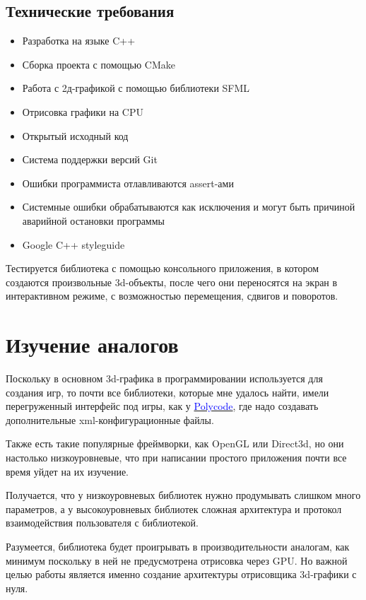 \documentclass{article}
\begin{document}
\subsection{Технические требования}
\begin{itemize}
\item Разработка на языке C++
\item Сборка проекта с помощью CMake
\item Работа с 2д-графикой с помощью библиотеки SFML
\item Отрисовка графики на CPU
\item Открытый исходный код
\item Система поддержки версий Git
\item Ошибки программиста отлавливаются assert-ами
\item Системные ошибки обрабатываются как исключения и могут быть причиной аварийной остановки программы
\item Google C++ styleguide
\end{itemize}

Тестируется библиотека с помощью консольного приложения, в котором создаются произвольные 3d-объекты, после чего они переносятся на экран в интерактивном режиме, с возможностью перемещения, сдвигов и поворотов.

\newpage

\section{Изучение аналогов}

Поскольку в основном 3d-графика в программировании используется для создания игр, то почти все библиотеки, которые мне удалось найти, имели перегруженный интерфейс под игры, как у \href{http://polycode.org/features/}{\textcolor{blue}{Polycode}}, где надо создавать дополнительные xml-конфигурационные файлы.

Также есть такие популярные фреймворки, как OpenGL или Direct3d, но они настолько низкоуровневые, что при написании простого приложения почти все время уйдет на их изучение.

Получается, что у низкоуровневых библиотек нужно продумывать слишком много параметров, а у высокоуровневых библиотек сложная архитектура и протокол взаимодействия пользователя с библиотекой.

Разумеется, библиотека будет проигрывать в производительности аналогам, как минимум поскольку в ней не предусмотрена отрисовка через GPU. Но важной целью работы является именно создание архитектуры отрисовщика 3d-графики с нуля.
\end{document}
